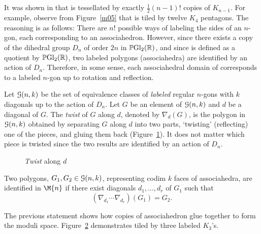 \documentclass[10pt]{amsart}
\begin{document}
\subsection{}
It was shown in \cite[\S2]{dev} that  is tessellated by exactly $\frac{1}{2}(n-1)!$ copies of $K_{n-1}$. For example, observe from Figure~\ref{m05} that  is tiled by twelve $K_4$ pentagons.  The reasoning is as follows: There are $n!$ possible ways of labeling the sides of an $n$-gon, each corresponding to an associahedron.  However, since there exists a copy of the dihedral group $D_n$ of order $2n$ in ${\mathbb P} {\rm Gl}_2({\mathbb R})$, and since  is defined as a quotient by ${\mathbb P} {\rm Gl}_2({\mathbb R})$, two labeled polygons (associahedra) are identified by an action of $D_n$. Therefore, in some sense, each associahedral domain of  corresponds to a labeled $n$-gon up to rotation and reflection.

\begin{defn}
Let ${\mathcal G}(n,k)$ be the set of equivalence classes of {\em labeled} regular $n$-gons with $k$ diagonals up to the action of $D_n$. Let $G$ be an element of ${\mathcal G}(n,k)$ and $d$ be a diagonal of $G$.  The {\em twist} of $G$ along $d$, denoted by $\nabla_d(G)$, is the polygon in ${\mathcal G}(n,k)$ obtained by separating $G$ along $d$ into two parts, `twisting' (reflecting) one of the pieces, and gluing them back (Figure~\ref{twist}).  It does not matter which piece is twisted since the two results are identified by an action of $D_n$.
\end{defn}

\begin{figure} [h]
\caption{{\em Twist} along $d$}
\label{twist}
\end{figure}

\begin{thm} \textup{\cite[\S4]{dev}}
Two polygons, $G_1, G_2 \in {\mathcal G}(n,k)$, representing codim $k$ faces of associahedra, are identified in $\M{n}$ if there exist diagonals $d_1, \ldots, d_r$ of $G_1$ such that $$(\nabla_{d_1} \cdots \nabla_{d_r}) (G_1) = G_2.$$
\label{t:glue}
\end{thm}

\noindent The previous statement shows how copies of associahedron glue together
to form the moduli space. Figure~\ref{m04} demonstrates  tiled by three labeled $K_3$'s.

\begin{figure} [h]
\caption{}
\label{m04}
\end{figure}
\end{document}
